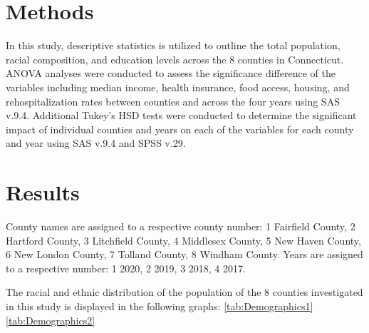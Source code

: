 \documentclass[12pt]{article}
\begin{document}
\section{Methods}\label{sec:meth}

In this study, descriptive statistics is utilized to outline the total population, racial composition, 
and education levels across the 8 counties in Connecticut. ANOVA analyses were 
conducted to assess the significance difference of the variables including median income, health insurance, food access, housing, 
and rehospitalization rates between counties and across the four years using SAS v.9.4. Additional 
Tukey's HSD tests were conducted to determine the significant impact of individual counties and years on
each of the variables for each county and year using SAS v.9.4 and SPSS v.29.

\section{Results}\label{sec:resu}

County names are assigned to a respective county number: 
1	Fairfield County,
2	Hartford County,
3	Litchfield County,
4	Middlesex County,
5	New Haven County,
6	New London County,
7	Tolland County,
8	Windham County.
Years are assigned to a respective number: 
1 2020,
2 2019,
3 2018,
4 2017.

The racial and ethnic distribution of the population of the 8 counties investigated in this study is displayed in the following graphs:
\ref{tab:Demographics1}
\ref{tab:Demographics2}


\begin{table}[h]
\label{tab:Demographics1}
  \caption{Demographics and Education Levels for Counties 1-4}
\end{table}
\end{document}
